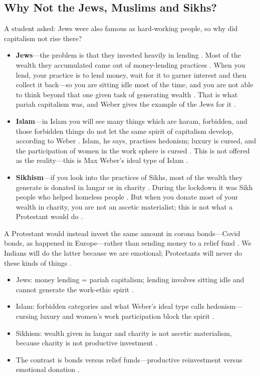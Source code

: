 \subsection{Why Not the Jews, Muslims and Sikhs?}
A student asked: Jews were also famous as hard-working people, so why did capitalism not rise there? 
\begin{itemize}
    \item \textbf{Jews}---the problem is that they invested heavily in lending . Most of the wealth they accumulated came out of money-lending practices . When you lend, your practice is to lend money, wait for it to garner interest and then collect it back---so you are sitting idle most of the time, and you are not able to think beyond that one given task of generating wealth . That is what pariah capitalism was, and Weber gives the example of the Jews for it .
    \item \textbf{Islam}---in Islam you will see many things which are haram, forbidden, and those forbidden things do not let the same spirit of capitalism develop, according to Weber . Islam, he says, practises hedonism; luxury is cursed, and the participation of women in the work sphere is cursed . This is not offered as the reality---this is Max Weber's ideal type of Islam .
    \item \textbf{Sikhism}---if you look into the practices of Sikhs, most of the wealth they generate is donated in langar or in charity . During the lockdown it was Sikh people who helped homeless people . But when you donate most of your wealth in charity, you are not an ascetic materialist; this is not what a Protestant would do .
\end{itemize}
A Protestant would instead invest the same amount in corona bonds---Covid bonds, as happened in Europe---rather than sending money to a relief fund . We Indians will do the latter because we are emotional; Protestants will never do these kinds of things .

\begin{QuickRevision}
\begin{itemize}
    \item Jews: money lending = pariah capitalism; lending involves sitting idle and cannot generate the work-ethic spirit .
    \item Islam: forbidden categories and what Weber's ideal type calls hedonism---cursing luxury and women's work participation block the spirit .
    \item Sikhism: wealth given in langar and charity is not ascetic materialism, because charity is not productive investment .
    \item The contrast is bonds versus relief funds---productive reinvestment versus emotional donation .
\end{itemize}
\end{QuickRevision}

